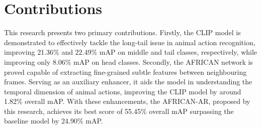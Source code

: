 \section{Contributions}
This research presents two primary contributions. Firstly, the CLIP model is demonstrated to effectively tackle the long-tail issue in animal action recognition, improving 21.36\% and 22.49\% mAP on middle and tail classes, respectively, while improving only 8.06\% mAP on head classes. Secondly, the AFRICAN network is proved capable of extracting fine-grained subtle features between neighbouring frames. Serving as an auxiliary enhancer, it aids the model in understanding the temporal dimension of animal actions, improving the CLIP model by around 1.82\% overall mAP. With these enhancements, the AFRICAN-AR, proposed by this research, achieves its best score of 55.45\% overall mAP surpassing the baseline model by 24.90\% mAP.


